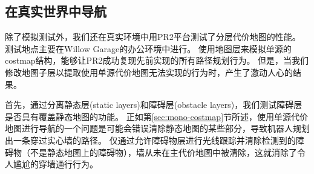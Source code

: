 \subsection{在真实世界中导航}
除了模拟测试外，我们还在真实环境中用PR2平台测试了分层代价地图的性能。 
测试地点主要在Willow Garage的办公环境中进行。 
使用地图层来模拟单源的costmap结构，能够让PR2成功复现先前实现的所有路径规划行为。 
但是，当我们修改地图子层以提取使用单源代价地图无法实现的行为时，产生了激动人心的结果。

首先，通过分离静态层(static layers)和障碍层(obstacle layers)，我们测试障碍层是否具有覆盖静态地图的功能。 
正如第\ref{sec:mono-costmap}节所述，使用单源代价地图进行导航的一个问题是可能会错误清除静态地图的某些部分，导致机器人规划出一条穿过实心墙的路径。 
仅通过允许障碍物层进行光线跟踪并清除检测到的障碍物（不是静态地图上的障碍物），墙从未在主代价地图中被清除，这就消除了令人尴尬的穿墙通行行为。

